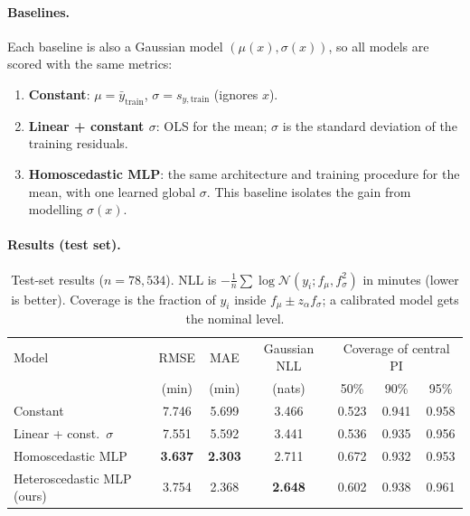 \documentclass[11pt]{article}
\begin{document}
\paragraph{Baselines.} Each baseline is also a Gaussian model $(\mu(x),\sigma(x))$, so all models
are scored with the same metrics:
\begin{enumerate}
 \item \textbf{Constant}: $\mu=\bar y_{\text{train}}$, $\sigma=s_{y,\text{train}}$ (ignores $x$).
 \item \textbf{Linear + constant $\sigma$}: OLS for the mean; $\sigma$ is the standard deviation of
 the training residuals.
 \item \textbf{Homoscedastic MLP}: the same architecture and training procedure for the mean,
 with one learned global $\sigma$. This baseline isolates the gain from modelling $\sigma(x)$.
\end{enumerate}

\paragraph{Results (test set).}
\begin{table}[H]\centering
\begin{tabular}{lcccccc}
\toprule
Model & RMSE & MAE & Gaussian NLL & \multicolumn{3}{c}{Coverage of central PI} \\
      & (min) & (min) & (nats) & 50\% & 90\% & 95\% \\
\midrule
Constant                    & 7.746 & 5.699 & 3.466 & 0.523 & 0.941 & 0.958 \\
Linear + const.\ $\sigma$   & 7.551 & 5.592 & 3.441 & 0.536 & 0.935 & 0.956 \\
Homoscedastic MLP           & \textbf{3.637} & \textbf{2.303} & 2.711 & 0.672 & 0.932 & 0.953 \\
Heteroscedastic MLP (ours)  & 3.754 & 2.368 & \textbf{2.648} & 0.602 & 0.938 & 0.961 \\
\bottomrule
\end{tabular}
\caption{Test-set results ($n=78{,}534$). NLL is $-\frac1n\sum\log\mathcal N(y_i;f_\mu,f_\sigma^2)$ in
minutes (lower is better). Coverage is the fraction of $y_i$ inside
$f_\mu\pm z_{\alpha}f_\sigma$; a calibrated model gets the nominal level.}
\end{table}
\end{document}
